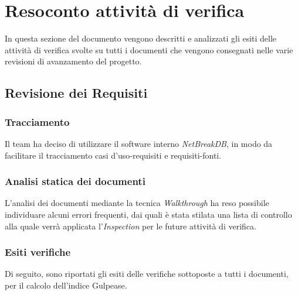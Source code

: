 \newpage
\section{Resoconto attività di verifica}
In questa sezione del documento vengono descritti e analizzati gli esiti delle attività di verifica svolte su tutti i documenti che vengono consegnati nelle varie revisioni di avanzamento del progetto.
	
	\subsection{Revisione dei Requisiti}
			
		\subsubsection{Tracciamento}
		Il team ha deciso di utilizzare il software interno \textit{NetBreakDB}, in modo da facilitare il tracciamento casi d’uso-requisiti e requisiti-fonti.
			
		\subsubsection{Analisi statica dei documenti}
		L’analisi dei documenti mediante la tecnica \textit{Walkthrough} ha reso possibile individuare alcuni errori frequenti, dai quali è stata stilata una lista di controllo alla quale verrà applicata l’\textit{Inspection} per le future attività di verifica.
			
		\subsubsection{Esiti verifiche}
		Di seguito, sono riportati gli esiti delle verifiche sottoposte a tutti i documenti, per il calcolo dell’indice Gulpease.
	
